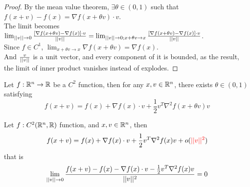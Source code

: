 \documentclass{article}
\begin{document}
    \begin{proof}
    	By the mean value theorem, $\exists \theta \in (0, 1)$ such that $f(x+v) - f(x) = \nabla f(x + \theta v) \cdot v$.\\
    	The limit becomes $\lim_{\vert \vert {v} \vert \vert \to 0} \frac{[\nabla f(x + \theta v) - \nabla f(x)] \cdot v}{\vert \vert {v} \vert \vert} = \lim_{\vert \vert {v} \vert \vert \to 0; x + \theta v \to x} \frac{[\nabla f(x + \theta v) - \nabla f(x)] \cdot v}{\vert \vert {v} \vert \vert}$.\\
    	Since $f \in C^1$, $\lim_{x + \theta v \to x} \nabla f(x + \theta v) = \nabla f(x)$.\\
    	And $\frac{v}{\vert \vert {v} \vert \vert}$ is a unit vector, and every component of it is bounded, as the result, the limit of inner product vanishes instead of explodes.
    \end{proof}
    
    \begin{theorem}
        Let $f: \mathbb{R}^n \to \mathbb{R}$ be a $C^2$ function, then for any $x, v \in \mathbb{R}^n$, there exists $\theta \in (0, 1)$ satisfying
        \begin{equation}
            f(x + v) = f(x) + \nabla f(x) \cdot v + \frac{1}{2} v^T \nabla^2 f(x + \theta v) v
        \end{equation}
    \end{theorem}
    
    \begin{proposition}
        Let $f: C^2(\mathbb{R}^n, \mathbb{R})$ function, and $x, v \in \mathbb{R}^n$, then
        \begin{equation}
            f(x + v) = f(x) + \nabla f(x) \cdot v + \frac{1}{2} v^T \nabla^2 f(x) v + o(\textcolor{red}{\vert \vert {v} \vert \vert^2})
        \end{equation}
        that is
        \begin{equation}
            \lim_{\vert \vert {v} \vert \vert \to 0} \frac{
                f(x + v) - f(x) - \nabla f(x) \cdot v - \frac{1}{2} v^T \nabla^2 f(x) v
            }{\vert \vert {v} \vert \vert^2} = 0
        \end{equation}
    \end{proposition}
    
\end{document}
